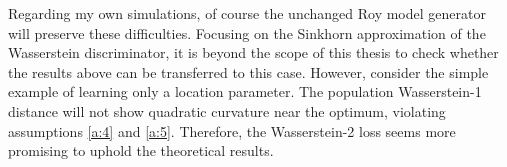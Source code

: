 Regarding my own simulations, of course the unchanged Roy model generator will preserve these difficulties.
Focusing on the Sinkhorn approximation of the Wasserstein discriminator, it is beyond the scope of this thesis to check whether the results above can be transferred to this case.
However, consider the simple example of learning only a location parameter.
The population Wasserstein-1 distance will not show quadratic curvature near the optimum, violating assumptions \ref{a:4} and \ref{a:5}. %
Therefore, the Wasserstein-2 loss seems more promising to uphold the theoretical results.